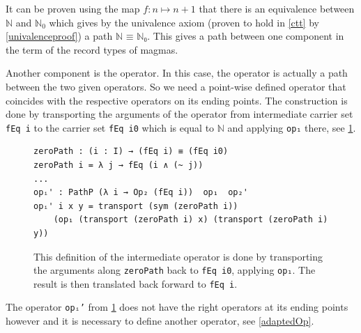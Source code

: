 \documentclass[12pt,a4paper,twoside,xetex]{book}
\begin{document}
It can be proven using the map $f: n \mapsto n + 1$ that there is an equivalence between $\mathbb{N}$ and $\mathbb{N}_0$ which gives by the univalence axiom (proven to hold in \cref{ctt} by \cref{univalenceproof}) a path $\texttt{ℕ ≡ ℕ₀}$. This gives a path between one component in the term of the record types of magmas. 

Another component is the operator. In this case, the operator is actually a path between the two given operators. So we need a point-wise defined operator that coincides with the respective operators on its ending points. The construction is done by transporting the arguments of the operator from intermediate carrier set \texttt{fEq i} to the carrier set \texttt{fEq i0} which is equal to $\mathbb{N}$ and applying \texttt{op₁} there, see \cref{zeroPathLift}.


\begin{figure}\label{zeroPathLift}
\centering 
\begin{BVerbatim}
zeroPath : (i : I) → (fEq i) ≡ (fEq i0)
zeroPath i = λ j → fEq (i ∧ (~ j))
...
opᵢ' : PathP (λ i → Op₂ (fEq i))  op₁  op₂'
opᵢ' i x y = transport (sym (zeroPath i))
    (op₁ (transport (zeroPath i) x) (transport (zeroPath i) y))
\end{BVerbatim}
\caption{This definition of the intermediate operator is done by transporting the arguments along \texttt{zeroPath} back to \texttt{fEq i0}, applying \texttt{op₁}. The result is then translated back forward to \texttt{fEq i}.}

\end{figure}

The operator \texttt{opᵢ'} from \cref{zeroPathLift} does not have the right operators at its ending points however and it is necessary to define another operator, see \cref{adaptedOp}.
\end{document}
